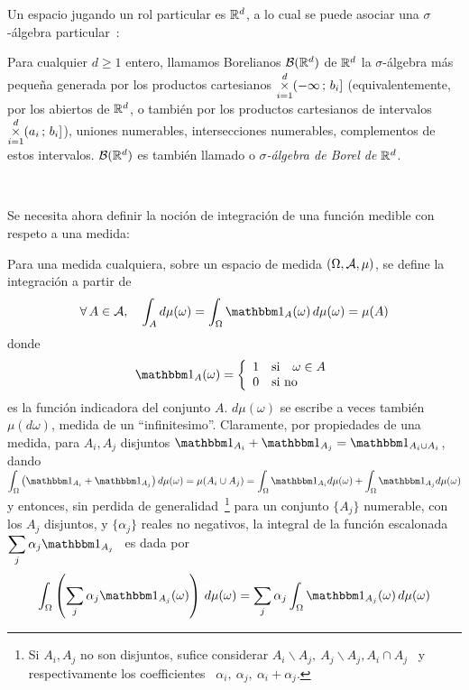 Un espacio  jugando un rol particular es  $\mathbb{R}^d$, a lo cual  se puede asociar
una $\sigma$-\'algebra particular~\cite{AthLah06, Bog07:v1, Bog07:v2, Coh13}:
%
\begin{definicion}
  Para  cualquier  $d  \ge  1$  entero,  llamamos  Borelianos  $\mathcal{B}(\mathbb{R}^d)$  de
  $\mathbb{R}^d$  la $\sigma$-\'algebra  m\'as peque\~na  generada por  los productos
  cartesianos   $\displaystyle   \operatorname*{\times}_{i=1}^d  (-\infty   \,   ;  \,   b_i]$
  \big(equivalentemente,  por los  abiertos de  $\mathbb{R}^d$, o  tambi\'en  por los
  productos cartesianos de intervalos  $\displaystyle \operatorname*{\times}_{i=1}^d (a_i \, ;
  \, b_i]$\big), \ie uniones numerables, intersecciones numerables, complementos
  de   estos   intervalos.    $\mathcal{B}(\mathbb{R}^d)$   es  tambi\'en   llamado   o   {\it
    $\sigma$-\'algebra de Borel de $\mathbb{R}^d$}.
\end{definicion}

\

Se necesita ahora definir la  noci\'on de integraci\'on de una funci\'on medible
con respeto a una medida:
%
\begin{definicion}
  Para una medida  cualquiera, sobre un espacio de  medida $(\Omega,\mathcal{A},\mu)$, se
  define la integraci\'on a partir de
  \[
  \forall \, A \in \A,  \quad \int_A d\mu(\omega) = \int_\Omega \un_A(\omega) \,
  d\mu(\omega) = \mu(A)
  \]
  donde
  \[
  \un_A(\omega) = \left\{
  \begin{array}{clr}
  1 & \mbox{si} \quad \omega \in A\\
  0 & \mbox{si no}
  \end{array} \right.
  \]
  es  la funci\'on  indicadora del  conjunto $A$.   $d\mu(\omega)$ se  escribe a
  veces  tambi\'en $\mu(d\omega)$, medida  de un  ``infinitesimo''.  Claramente,
  por  propiedades  de una  medida,  para $  A_i,  A_j$  disjuntos $\un_{A_i}  +
  \un_{A_j}  =  \un_{A_i \cup  A_i}$,  dando  $\displaystyle \int_\Omega  \left(
    \un_{A_i} + \un_{A_j} \right) d\mu(\omega) = \mu(A_i \cup A_j) = \int_\Omega
  \un_{A_i} d\mu(\omega)  + \int_\Omega \un_{A_j} d\mu(\omega)$  y entonces, sin
  perdida  de  generalidad~\footnote{Si  $A_i,  A_j$ no  son  disjuntos,  sufice
    considerar  $A_i\backslash A_j,  \: A_j\backslash  A_j,  A_i \cap  A_j$ \  y
    respectivamente los  coefficientes \ $\alpha_i,  \: \alpha_j, \:  \alpha_i +
    \alpha_j$.}   para  un  conjunto  $\{  A_j  \}$  numerable,  con  los  $A_j$
  disjuntos, y $\{ \alpha_j \}$ reales no negativos, la integral de la funci\'on
  escalonada \ $\displaystyle \sum_j \alpha_j \un_{A_j}$ \ es dada por
  \[
  \int_\Omega \left( \sum_j \alpha_j \un_{A_j}(\omega) \right) \, d\mu(\omega) =
  \sum_j \alpha_j \int_\Omega \un_{A_j}(\omega) \, d\mu(\omega)
  \]
\end{definicion}


